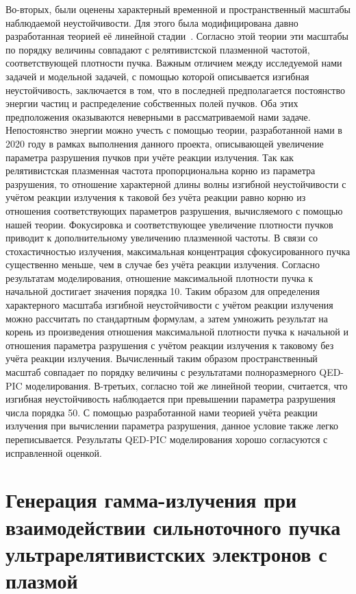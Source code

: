 Во-вторых, были оценены характерный временной и пространственный масштабы наблюдаемой неустойчивости.
Для этого была модифицирована давно разработанная теорией её линейной стадии~\cite{chin1987stability, yokoya1992beam}.
Согласно этой теории эти масштабы по порядку величины совпадают с релятивистской плазменной частотой, соответствующей плотности пучка.
Важным отличием между исследуемой нами задачей и модельной задачей, с помощью которой описывается изгибная неустойчивость, заключается в том, что в последней предполагается постоянство энергии частиц и распределение собственных полей пучков.
Оба этих предположения оказываются неверными в рассматриваемой нами задаче.
Непостоянство энергии можно учесть с помощью теории, разработанной нами в 2020 году в рамках выполнения данного проекта, описывающей увеличение параметра разрушения пучков при учёте реакции излучения.
Так как релятивистская плазменная частота пропорциональна корню из параметра разрушения, то отношение характерной длины волны изгибной неустойчивости с учётом реакции излучения к таковой без учёта реакции равно корню из отношения соответствующих параметров разрушения, вычисляемого с помощью нашей теории.
Фокусировка и соответствующее увеличение плотности пучков приводит к дополнительному увеличению плазменной частоты.
В связи со стохастичностью излучения, максимальная концентрация сфокусированного пучка существенно меньше, чем в случае без учёта реакции излучения. Согласно результатам моделирования, отношение максимальной плотности пучка к начальной достигает значения порядка 10.
Таким образом для определения характерного масштаба изгибной неустойчивости с учётом реакции излучения можно рассчитать по стандартным формулам, а затем умножить результат на корень из произведения отношения максимальной плотности пучка к начальной и отношения параметра разрушения с учётом реакции излучения к таковому без учёта реакции излучения.
Вычисленный таким образом пространственный масштаб совпадает по порядку величины с результатами полноразмерного QED-PIC моделирования.
В-третьих, согласно той же линейной теории, считается, что изгибная неустойчивость наблюдается при превышении параметра разрушения числа порядка 50.
С помощью разработанной нами теорией учёта реакции излучения при вычислении параметра разрушения, данное условие также легко переписывается. Результаты QED-PIC моделирования хорошо согласуются с исправленной оценкой.

\section{Генерация гамма-излучения при взаимодействии сильноточного пучка ультрарелятивистских электронов с плазмой}
\label{sec:ch3/sec5}

